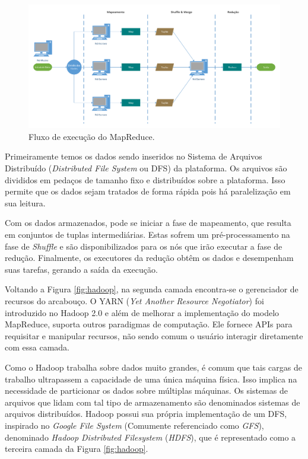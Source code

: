 \begin{figure}[ht]
 \centerline{\includegraphics[width=1\textwidth]{./img/mapreduce-workflow.pdf}}
 \caption{Fluxo de execução do MapReduce.}
 \label{fig:mrworkflow}
\end{figure}

Primeiramente temos os dados sendo inseridos no Sistema de Arquivos Distribuído 
(\textit{Distributed File System} ou DFS) da plataforma. Os arquivos são 
divididos em pedaços de tamanho fixo e distribuídos sobre a plataforma. Isso 
permite que os dados sejam tratados de forma rápida pois há paralelização em sua 
leitura.

Com os dados armazenados, pode se iniciar a fase de mapeamento, que resulta em 
conjuntos de tuplas intermediárias. Estas sofrem um pré-processamento na fase 
de \textit{Shuffle} e são disponibilizados para os nós que irão executar a fase 
de redução. Finalmente, os executores da redução obtêm os dados e desempenham 
suas tarefas, gerando a saída da execução.

Voltando a Figura \ref{fig:hadoop}, na segunda camada encontra-se o gerenciador 
de recursos do arcabouço. O YARN (\textit{Yet Another Resource Negotiator}) foi 
introduzido no Hadoop 2.0 e além de melhorar a implementação do modelo 
MapReduce, suporta outros paradigmas de computação. Ele fornece APIs para 
requisitar e manipular recursos, não sendo comum o usuário interagir 
diretamente com essa camada.

Como o Hadoop trabalha sobre dados muito grandes, é comum que tais cargas de 
trabalho ultrapassem a capacidade de uma única máquina física. Isso implica na 
necessidade de particionar os dados sobre múltiplas máquinas. Os sistemas de 
arquivos que lidam com tal tipo de armazenamento são denominados sistemas de 
arquivos distribuídos. Hadoop possui sua própria implementação de um 
DFS, inspirado no \textit{Google File System} (Comumente 
referenciado como \textit{GFS}), denominado \textit{Hadoop Distributed 
Filesystem} (\textit{HDFS}), que é representado como a terceira camada da 
Figura \ref{fig:hadoop}.

